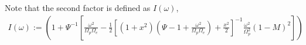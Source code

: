 \documentclass[]{article}
\begin{document}
Note that the second factor is defined as $I(\omega)$, 
\begin{align}
I(\omega) := \left( 1 +\Psi^{-1} \left[  \frac{ \omega^2}{\Omega_p\Omega_e} - \frac{1}{2}\left[(1+x^2)\left(\Psi - 1 + \frac{\omega^2}{\Omega_p\Omega_e}\right) + \frac{x^2}{2}\right]^{-1} \frac{\omega^2}{\Omega_p^2}(1-M)^2  \right] \right)
\end{align}

\end{document}
